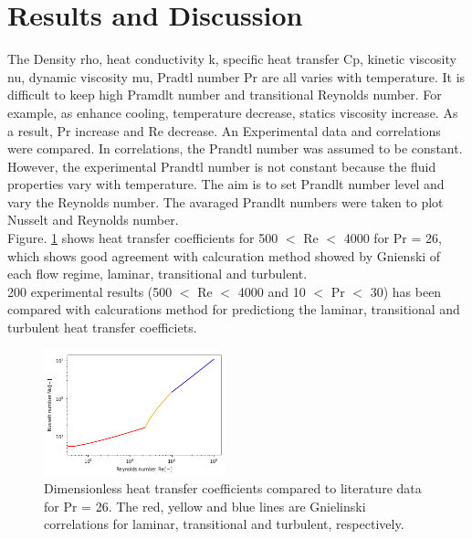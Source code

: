 \documentclass[conference]{IEEEtran}
\begin{document}

\section{Results and Discussion}
The Density rho, heat conductivity k, specific heat transfer Cp, kinetic viscosity nu, dynamic viscosity mu, Pradtl number Pr are all varies with temperature.
It is difficult to keep high Pramdlt number and transitional Reynolds number.
For example, as enhance cooling, temperature decrease,
statics viscosity increase.
As a result, Pr increase and Re decrease.
An Experimental data and correlations were compared.
In correlations, the Prandtl number was assumed to be constant.
However, the experimental Prandtl number is not constant because the fluid properties vary with temperature.
The aim is to set Prandlt number level and vary the Reynolds number.
The avaraged Prandlt numbers were taken to plot Nusselt and Reynolds number. \\
Figure. \ref{result} shows heat transfer coefficients for 500 $<$ Re $<$ 4000 for Pr = 26, which shows good agreement with calcuration method showed by Gnienski of each flow regime, laminar, transitional and turbulent.\\
200 experimental results (500 $<$ Re $<$ 4000 and 10 $<$ Pr $<$ 30) has been compared with calcurations method for predictiong the laminar, transitional and turbulent heat transfer coefficiets.

\begin{figure}[htbp]
  \centering
  \vspace{4zh}
\includegraphics[width=0.47\textwidth,natwidth=400,natheight=200]{fig/result.png}
  \caption{Dimensionless heat transfer coefficients compared to literature data for Pr = 26. The red, yellow and blue lines are Gnielinski correlations for laminar, transitional and turbulent, respectively.}
  \label{result}
\end{figure}
\end{document}
